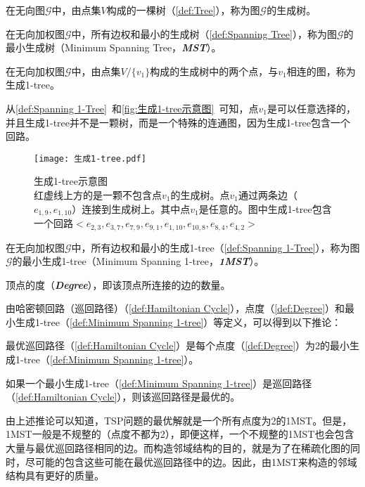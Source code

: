\begin{definition}[生成树]
    \label{def:Spanning Tree}
    在无向图$\mathcal{G}$中，由点集$V$构成的一棵树（\autoref{def:Tree}），称为图$\mathcal{G}$的生成树。
\end{definition}
\begin{definition}[最小生成树]
    \label{def:Minimum Spanning Tree}
    在无向加权图$\mathcal{G}$中，所有边权和最小的生成树（\autoref{def:Spanning Tree}），称为图$\mathcal{G}$的最小生成树（Minimum Spanning Tree，\emph{\textbf{MST}}）。
\end{definition}
\begin{definition}[生成1-tree]
    \label{def:Spanning 1-Tree}
    在无向加权图$\mathcal{G}$中，由点集$V/\{v_1\}$构成的生成树中的两个点，与$v_1$相连的图，称为生成1-tree。
\end{definition}
\par
从\autoref{def:Spanning 1-Tree}~和\autoref{fig:生成1-tree示意图}~可知，点$v_1$是可以任意选择的，并且生成1-tree并不是一颗树，而是一个特殊的连通图，因为生成1-tree包含一个回路。
\begin{figure}[htb]
    \texttt{[image: 生成1-tree.pdf]}
    \caption[生成1-tree示意图]{生成1-tree示意图 \\ 红虚线上方的是一颗不包含点$v_1$的生成树。点$v_1$通过两条边（$e_{1,9}, e_{1,10}$）连接到生成树上。其中点$v_1$是任意的。图中生成1-tree包含一个回路$<e_{2,3}, e_{3,7}, e_{7,9}, e_{9,1}, e_{1,10}, e_{10,8}, e_{8,4}, e_{4,2}>$}
    \label{fig:生成1-tree示意图}
\end{figure}
\begin{definition}
    \label{def:Minimum Spanning 1-tree}
    在无向加权图$\mathcal{G}$中，所有边权和最小的生成1-tree（\autoref{def:Spanning 1-Tree}），称为图$\mathcal{G}$的最小生成1-tree（Minimum Spanning 1-tree，\emph{\textbf{1MST}}）。
\end{definition}
\begin{definition}[点度]
    \label{def:Degree}
    顶点的度（\emph{\textbf{Degree}}），即该顶点所连接的边的数量。    
\end{definition}
\par
由哈密顿回路（巡回路径）（\autoref{def:Hamiltonian Cycle}），点度（\autoref{def:Degree}）和最小生成1-tree（\autoref{def:Minimum Spanning 1-tree}）等定义，可以得到以下推论：
\begin{corollary}
    \label{cor:Optimal Tour1}
    最优巡回路径（\autoref{def:Hamiltonian Cycle}）是每个点度（\autoref{def:Degree}）为2的最小生成1-tree（\autoref{def:Minimum Spanning 1-tree}）。
\end{corollary}
\begin{corollary}
    \label{cor:Optimal Tour2}
    如果一个最小生成1-tree（\autoref{def:Minimum Spanning 1-tree}）是巡回路径（\autoref{def:Hamiltonian Cycle}），则该巡回路径是最优的。
\end{corollary}
\par
由上述推论可以知道，TSP问题的最优解就是一个所有点度为2的1MST。但是，1MST一般是不规整的（点度不都为2），即便这样，一个不规整的1MST也会包含大量与最优巡回路径相同的边。而构造邻域结构的目的，就是为了在稀疏化图的同时，尽可能的包含这些可能在最优巡回路径中的边。因此，由1MST来构造的邻域结构具有更好的质量。


